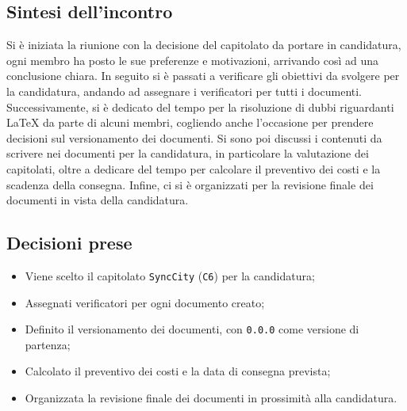 \documentclass[8pt]{article}
\begin{document}
\subsection{Sintesi dell'incontro}
Si è iniziata la riunione con la decisione del capitolato da portare in candidatura, ogni membro ha posto le sue preferenze e motivazioni, arrivando così ad una conclusione chiara. In seguito si è passati a verificare gli obiettivi da svolgere per la candidatura, andando ad assegnare i verificatori per tutti i documenti. Successivamente, si è dedicato del tempo per la risoluzione di dubbi riguardanti \LaTeX\: da parte di alcuni membri, cogliendo anche l'occasione per prendere decisioni sul versionamento dei documenti. Si sono poi discussi i contenuti da scrivere nei documenti per la candidatura, in particolare la valutazione dei capitolati, oltre a dedicare del tempo per calcolare il preventivo dei costi e la scadenza della consegna. Infine, ci si è organizzati per la revisione finale dei documenti in vista della candidatura.
\subsection{Decisioni prese}
\begin{itemize}
	\setlength\itemsep{0em}
	\item Viene scelto il capitolato \texttt{SyncCity} (\texttt{C6}) per la candidatura;
	\item Assegnati verificatori per ogni documento creato;
	\item Definito il versionamento dei documenti, con \texttt{0.0.0} come versione di partenza;
	\item Calcolato il preventivo dei costi e la data di consegna prevista;
	\item Organizzata la revisione finale dei documenti in prossimità alla candidatura.
	\\\\
\end{itemize}
\end{document}
